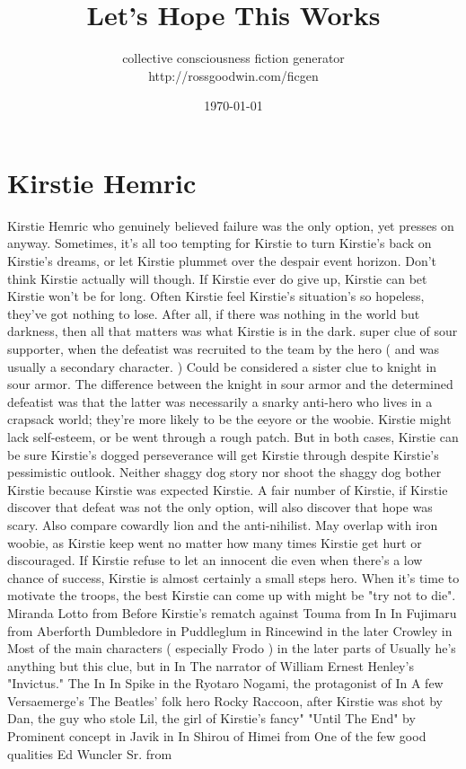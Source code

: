 \documentclass[12pt]{book}
\title{Let's Hope This Works}
\author{collective consciousness fiction generator\\http://rossgoodwin.com/ficgen}
\date{\today}
\begin{document}
\maketitle



\chapter{Kirstie Hemric}

Kirstie Hemric who genuinely believed failure was the only option, yet presses on anyway. Sometimes, it's all too tempting for Kirstie to turn Kirstie's back on Kirstie's dreams, or let Kirstie plummet over the despair event horizon. Don't think Kirstie actually will though. If Kirstie ever do give up, Kirstie can bet Kirstie won't be for long. Often Kirstie feel Kirstie's situation's so hopeless, they've got nothing to lose. After all, if there was nothing in the world but darkness, then all that matters was what Kirstie is in the dark. super clue of sour supporter, when the defeatist was recruited to the team by the hero ( and was usually a secondary character. ) Could be considered a sister clue to knight in sour armor. The difference between the knight in sour armor and the determined defeatist was that the latter was necessarily a snarky anti-hero who lives in a crapsack world; they're more likely to be the eeyore or the woobie. Kirstie might lack self-esteem, or be went through a rough patch. But in both cases, Kirstie can be sure Kirstie's dogged perseverance will get Kirstie through despite Kirstie's pessimistic outlook. Neither shaggy dog story nor shoot the shaggy dog bother Kirstie because Kirstie was expected Kirstie. A fair number of Kirstie, if Kirstie discover that defeat was not the only option, will also discover that hope was scary. Also compare cowardly lion and the anti-nihilist. May overlap with iron woobie, as Kirstie keep went no matter how many times Kirstie get hurt or discouraged. If Kirstie refuse to let an innocent die even when there's a low chance of success, Kirstie is almost certainly a small steps hero. When it's time to motivate the troops, the best Kirstie can come up with might be "try not to die". Miranda Lotto from Before Kirstie's rematch against Touma from In In Fujimaru from Aberforth Dumbledore in Puddleglum in Rincewind in the later Crowley in Most of the main characters ( especially Frodo ) in the later parts of Usually he's anything but this clue, but in In The narrator of William Ernest Henley's "Invictus." The In In Spike in the Ryotaro Nogami, the protagonist of In A few Versaemerge's The Beatles' folk hero Rocky Raccoon, after Kirstie was shot by Dan, the guy who stole Lil, the girl of Kirstie's fancy" "Until The End" by Prominent concept in Javik in In Shirou of Himei from One of the few good qualities Ed Wuncler Sr. from
\end{document}
